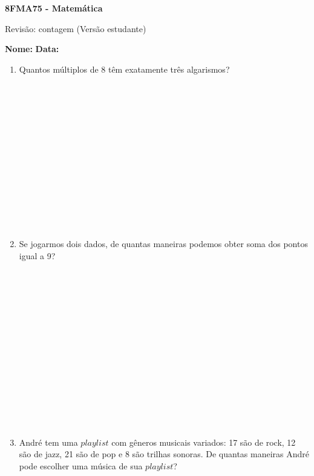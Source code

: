 \documentclass[a4paper,14pt]{article}
\begin{document}
	
	\noindent\textbf{8FMA75 - Matemática} 
	
	\begin{center}Revisão: contagem (Versão estudante)
	\end{center}
	
	\noindent\textbf{Nome:} \underline{\hspace{10cm}}
	\noindent\textbf{Data:} \underline{\hspace{4cm}}
	
	
	
    \begin{multicols}{2}
		\begin{enumerate}
			\item Quantos múltiplos de 8 têm exatamente três algarismos? \\\\\\\\\\\\\\\\\\\\\\\\\\\\
			\item Se jogarmos dois dados, de quantas maneiras podemos obter soma dos pontos igual a 9? \\\\\\\\\\\\\\\\\\\\\\\\\\\\\\
			\item André tem uma $playlist$ com gêneros musicais variados: 17 são de rock, 12 são de jazz, 21 são de pop e 8 são trilhas sonoras. De quantas maneiras André pode escolher uma música de sua $playlist$? \\\\\\\\\\\\\\\\\\\\\\\\\\\\

\end{enumerate}
\end{multicols}
\end{document}
